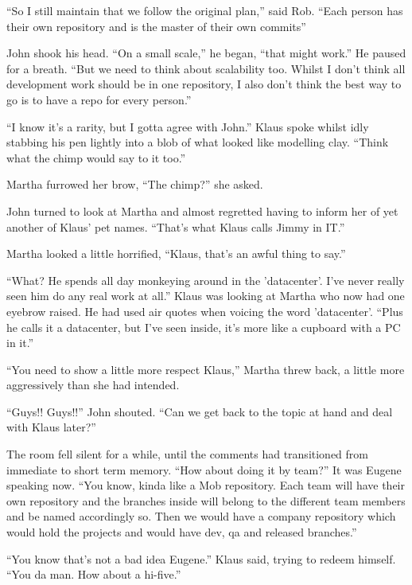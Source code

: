 \begin{trenches}
``So I still maintain that we follow the original plan,'' said Rob.  ``Each person has their own repository and is the master of their own commits''

John shook his head.  ``On a small scale,'' he began, ``that might work.''  He paused for a breath.  ``But we need to think about scalability too.  Whilst I don't think all development work should be in one repository, I also don't think the best way to go is to have a repo for every person.''

``I know it's a rarity, but I gotta agree with John.''  Klaus spoke whilst idly stabbing his pen lightly into a blob of what looked like modelling clay.  ``Think what the chimp would say to it too.''

Martha furrowed her brow, ``The chimp?'' she asked.

John turned to look at Martha and almost regretted having to inform her of yet another of Klaus' pet names.  ``That's what Klaus calls Jimmy in IT.''  

Martha looked a little horrified, ``Klaus, that's an awful thing to say.''  

``What?  He spends all day monkeying around in the 'datacenter'.  I've never really seen him do any real work at all.''  Klaus was looking at Martha who now had one eyebrow raised.  He had used air quotes when voicing the word 'datacenter'.  ``Plus he calls it a datacenter, but I've seen inside, it's more like a cupboard with a PC in it.''

``You need to show a little more respect Klaus,'' Martha threw back, a little more aggressively than she had intended.

``Guys!! Guys!!''  John shouted.  ``Can we get back to the topic at hand and deal with Klaus later?''

The room fell silent for a while, until the comments had transitioned from immediate to short term memory.  ``How about doing it by team?''  It was Eugene speaking now.  ``You know, kinda like a Mob repository.  Each team will have their own repository and the branches inside will belong to the different team members and be named accordingly so.  Then we would have a company repository which would hold the projects and would have dev, qa and released branches.''

``You know that's not a bad idea Eugene.''  Klaus said, trying to redeem himself.  ``You da man.  How about a hi-five.''

\end{trenches}

